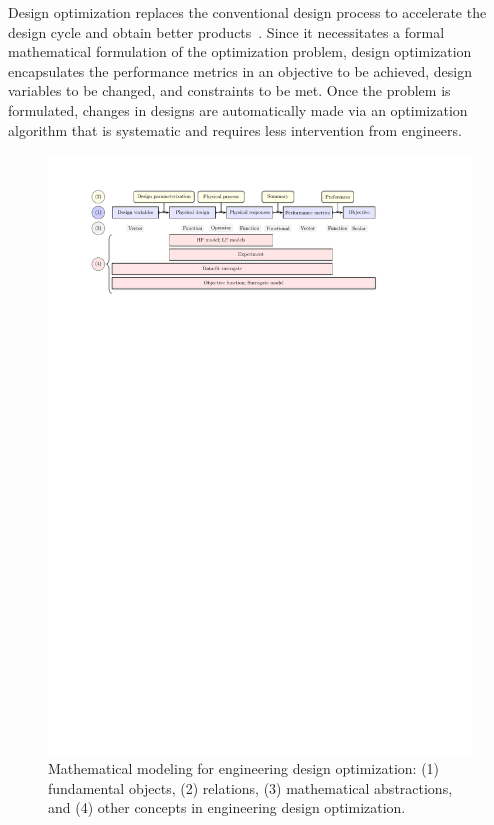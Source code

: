 \documentclass[journal ]{new-aiaa}
\begin{document}
	Design optimization replaces the conventional design process to accelerate the design cycle and obtain better products~\citep{Kochenderfer2019,Martins2021}.
	Since it necessitates a formal mathematical formulation of the optimization problem, design optimization encapsulates the performance metrics in an objective to be achieved, design variables to be changed, and constraints to be met.
	Once the problem is formulated, changes in designs are automatically made via an optimization algorithm that is systematic and requires less intervention from engineers.
	
	\begin{figure}
		\centering
		\includegraphics[scale=0.75]{Fig1.pdf}
		\caption{Mathematical modeling for engineering design optimization: (1) fundamental objects, (2) relations, (3) mathematical abstractions, and (4) other concepts in engineering design optimization.}
		\label{Fig-1}
	\end{figure}
	
\end{document}
